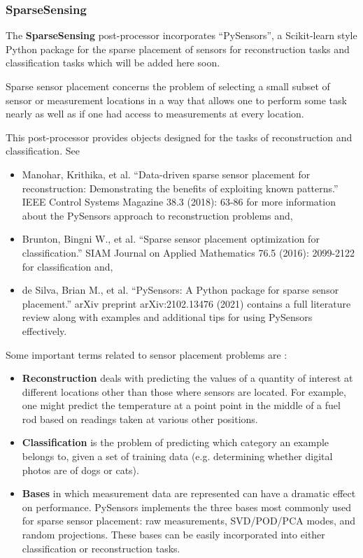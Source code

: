\subsubsection{SparseSensing}
\label{SparseSensing}
The \textbf{SparseSensing} post-processor incorporates ``PySensors'', a Scikit-learn style Python package for the sparse placement of sensors for reconstruction tasks and classification tasks which will be added here soon.

Sparse sensor placement concerns the problem of selecting a small subset of sensor or measurement locations in a way that allows one to perform some task nearly as well as if one had access to measurements at every location.

This post-processor provides objects designed for the tasks of reconstruction and classification. See

\begin{itemize}
    \item Manohar, Krithika, et al. ``Data-driven sparse sensor placement for reconstruction: Demonstrating the benefits of exploiting known patterns.'' IEEE Control Systems Magazine 38.3 (2018): 63-86 for more information about the PySensors approach to reconstruction problems and,
    \item Brunton, Bingni W., et al. ``Sparse sensor placement optimization for classification.'' SIAM Journal on Applied Mathematics 76.5 (2016): 2099-2122 for classification and,
    \item de Silva, Brian M., et al. ``PySensors: A Python package for sparse sensor placement.'' arXiv preprint arXiv:2102.13476 (2021) contains a full literature review along with examples and additional tips for using PySensors effectively.
\end{itemize} 

Some important terms related to sensor placement problems are : 

\begin{itemize}
    \item \textbf{Reconstruction} deals with predicting the values of a quantity of interest at different locations other than those where sensors are located. For example, one might predict the temperature at a point point in the middle of a fuel rod based on readings taken at various other positions. 

    \item \textbf{Classification} is the problem of predicting which category an example belongs to, given a set of training data (e.g. determining whether digital photos are of dogs or cats).

    \item \textbf{Bases} in which measurement data are represented can have a dramatic effect on performance. PySensors implements the three bases most commonly used for sparse sensor placement: raw measurements, SVD/POD/PCA modes, and random projections. These bases can be easily incorporated into either classification or reconstruction tasks. 
\end{itemize}

